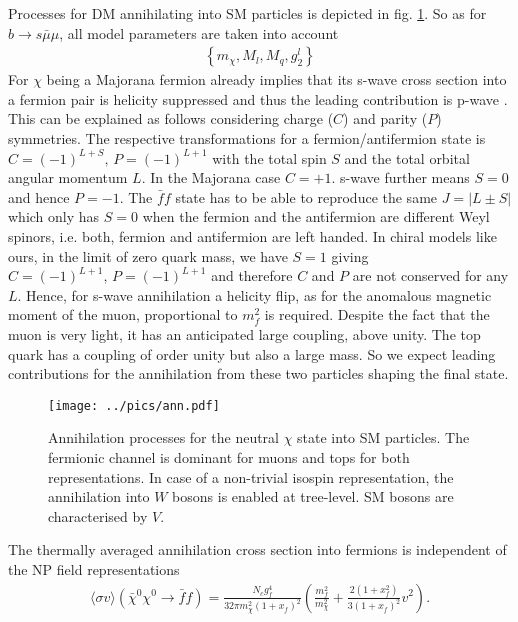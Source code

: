 Processes for DM annihilating into SM particles is depicted in fig. \ref{pic_annihilation}. So as for $b\rightarrow s \bar\mu\mu$, all model parameters are taken into
account
\begin{align}
 \left\{m_\chi, M_l, M_q, g^l_2\right\}
\end{align}
For $\chi$ being a Majorana fermion already implies that its s-wave cross section into a fermion pair is helicity suppressed and 
thus the leading contribution is p-wave \cite{1307.8120}. This can be explained as follows considering charge ($C$) and parity ($P$) symmetries.
The respective transformations for a fermion/antifermion state is $C=(-1)^{L+S},\,P=(-1)^{L+1}$ with the total spin $S$ and the total orbital angular
momentum $L$. 
In the Majorana case $C=+1$. s-wave further means $S=0$ and hence $P=-1$. The $\bar f f$ state has to be able to reproduce the same $J=|L\pm S|$ 
which only has $S=0$ when the fermion and the antifermion are different Weyl spinors, i.e. both, fermion and antifermion are left handed.
In chiral models like ours, in the limit of zero quark mass, we have $S=1$ giving $C=(-1)^{L+1},\,P=(-1)^{L+1}$ and therefore $C$ and $P$ are not 
conserved for any $L$. Hence, for s-wave annihilation a helicity flip, as for the anomalous magnetic moment of the muon, proportional to $m_f^2$ is 
required. Despite the fact that the muon is very light, it has an anticipated large coupling, above unity. The top quark has a coupling of order unity
but also a large mass. So we expect leading contributions for the annihilation from these two particles shaping the final state.
\begin{figure}[t]
 \texttt{[image: ../pics/ann.pdf]}
 \caption{Annihilation processes for the neutral $\chi$ state into SM particles. The fermionic channel is dominant for muons and tops for both 
 representations. In case of a non-trivial isospin representation, the annihilation into $W$ bosons is enabled at tree-level. 
 SM bosons are characterised by $V$.}
 \label{pic_annihilation}
\end{figure}
The thermally averaged annihilation cross section into fermions is independent of the NP field representations \cite{1503.01500}
\begin{align}
 \langle \sigma v \rangle \left(\bar \chi^0 \chi^0 \rightarrow \bar f f\right) = \frac{N_c g_f^4}{32\pi m_\chi^2\left(1+x_f\right)^2} \left(\frac{m_f^2}{m_\chi^2} + \frac{2\left(1+x_f^2\right)}{3\left(1+x_f\right)^2} v^2\right)  .
\end{align}
